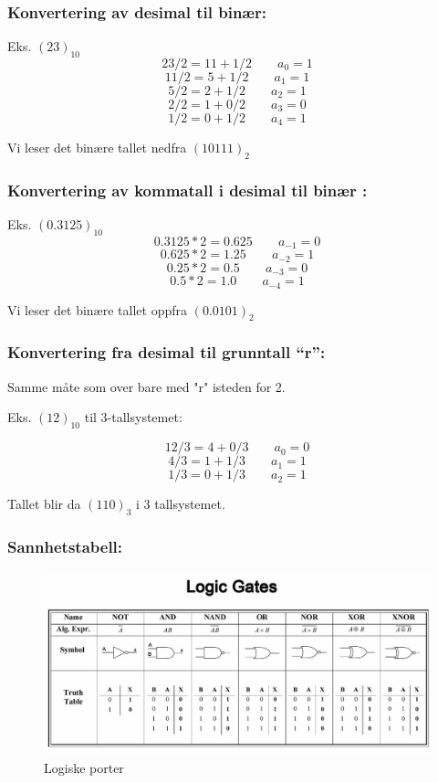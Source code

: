 \documentclass{article}
\begin{document}
	
	
	\subsubsection{Konvertering av desimal til binær:}
	
	Eks. $(23)_{10}$
	$$ 23/2 = 11 + 1/2 \qquad a_0 = 1 $$
	$$ 11/2 = 5 + 1/2 \qquad a_1 = 1 $$
	$$ 5/2 = 2 + 1/2 \qquad a_2 = 1 $$	
	$$ 2/2 = 1 + 0/2 \qquad a_3 = 0 
	$$
	$$1/2 = 0 + 1/2 \qquad a_4 = 1
	$$
	
	Vi leser det binære tallet nedfra $(10111)_{2}$
	
	\subsubsection{Konvertering av kommatall i desimal til binær :}
	Eks. $(0.3125)_{10}$
	$$ 0.3125*2 = 0.625 \qquad a_{-1} = 0 $$
	$$ 0.625*2 = 1.25 \qquad a_{-2} = 1 $$
	$$ 0.25*2 = 0.5 \qquad a_{-3} = 0 $$	
	$$ 0.5*2 = 1.0 \qquad a_{-4} = 1 $$
		
	Vi leser det binære tallet oppfra $(0.0101)_{2}$
	
	\subsubsection{Konvertering fra desimal til grunntall “r”:}
	Samme måte som over bare med "r" isteden for 2.
	
	Eks. $(12)_{10}$ til 3-tallsystemet:
	
	$$ 12/3 = 4 + 0/3 \qquad a_0 = 0$$
	$$ 4/3 = 1 + 1/3 \qquad a_1 = 1$$
	$$ 1/3 = 0 + 1/3 \qquad a_2 = 1 $$
	
	Tallet blir da $(110)_3$ i 3 tallsystemet.
	
	\subsubsection{Sannhetstabell:}
		
	\begin{figure}[H]
		\includegraphics[scale=0.35]{GATES.jpg}
		\caption{Logiske porter}
	\end{figure}
	
\end{document}

